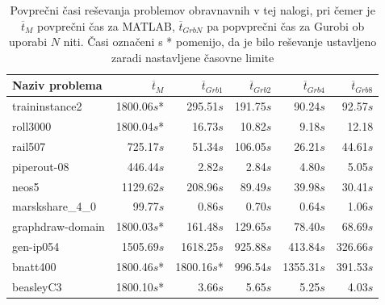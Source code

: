 \documentclass[a4paper,11pt]{article}
\begin{document}
\begin{table} \centering
\begin{tabular}{| l | r | r | r | r | r |}
\hline
Naziv problema & $\overline{t}_{M}$ & $\overline{t}_{Grb1}$ & $\overline{t}_{Grb2}$ & $\overline{t}_{Grb4}$  & $\overline{t}_{Grb8}$    \\
\hline
traininstance2 & 1800.06$s$* & 295.51$s$ & 191.75$s$ & 90.24$s$ & 92.57$s$ \\
roll3000 & 1800.04$s$* & 16.73$s$ & 10.82$s$ & 9.18$s$ & 12.18 \\
rail507 & 725.17$s$  & 51.34$s$ & 106.05$s$ & 26.21$s$ & 44.61$s$ \\
piperout-08 & 446.44$s$ & 2.82$s$ & 2.84$s$ & 4.80$s$ & 5.05$s$ \\
neos5 & 1129.62$s$ & 208.96$s$ & 89.49$s$ & 39.98$s$ & 30.41$s$ \\
marskshare\_4\_0 & 99.77$s$ & 0.86$s$ & 0.70$s$ & 0.64$s$ & 1.06$s$ \\
graphdraw-domain & 1800.03$s$* & 161.48$s$ & 129.65$s$ & 78.40$s$ & 68.69$s$ \\
gen-ip054 & 1505.69$s$ & 1618.25$s$ & 925.88$s$ & 413.84$s$ & 326.66$s$ \\
bnatt400 & 1800.46$s$* & 1800.16$s$* & 996.54$s$ & 1355.31$s$ & 391.53$s$ \\
beasleyC3 & 1800.10$s$* & 3.66$s$ & 5.65$s$ & 5.25$s$ & 4.03$s$ \\ 	
\hline
\end{tabular}
\caption{Povprečni časi reševanja problemov obravnavnih v tej nalogi, pri čemer je $\overline{t}_{M}$ povprečni čas za MATLAB, $\overline{t}_{GrbN}$ pa popvprečni čas za Gurobi ob uporabi $N$ niti. Časi označeni s * pomenijo, da je bilo reševanje ustavljeno zaradi nastavljene časovne limite}
\label{tab:bench_times}
\end{table}
\end{document}
